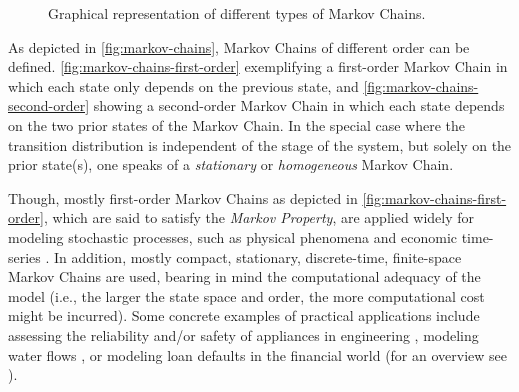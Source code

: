 \begin{figure}[t!]
	\captionsetup[subfigure]{justification=centering}
	\centering
	 \quad
	\caption{Graphical representation of different types of Markov Chains.}
	\label{fig:markov-chains}
\end{figure}

As depicted in \autoref{fig:markov-chains}, Markov Chains of different order can be defined. \autoref{fig:markov-chains-first-order} exemplifying a first-order Markov Chain in which each state only depends on the previous state, and \autoref{fig:markov-chains-second-order} showing a second-order Markov Chain in which each state depends on the two prior states of the Markov Chain.
In the special case where the transition distribution is independent of the stage of the system, but solely on the prior state(s), one speaks of a \textit{stationary} or \textit{homogeneous} Markov Chain.

Though, mostly first-order Markov Chains as depicted in \autoref{fig:markov-chains-first-order}, which are said to satisfy the \textit{Markov Property}, are applied widely for modeling stochastic processes, such as physical phenomena and economic time-series \cite{bacciu2015probabilistic}.
In addition, mostly compact, stationary, discrete-time, finite-space Markov Chains are used, bearing in mind the computational adequacy of the model (i.e., the larger the state space and order, the more computational cost might be incurred).
Some concrete examples of practical applications include assessing the reliability and/or safety of appliances in engineering \cite{cochran2001generic, cronvall2009combining,el2008optimal}, modeling water flows \cite{parent1991stochastic}, or modeling loan defaults \cite{grimshaw2011markov} in the financial world (for an overview see \cite{pasanisi2012estimating}).

